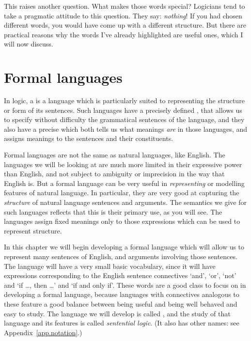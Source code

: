 This raises another question. What makes those words special? Logicians tend to take a pragmatic attitude to this question. They say: \emph{nothing}! If you had chosen different words, you would have come up with a different structure. But there are practical reasons why the words I've already highlighted are useful ones, which I will now discuss.

\section{Formal languages}

In logic, a  is a language which is particularly suited to representing the structure or form of its sentences. Such languages have a precisely defined , that allows us to specify without difficulty the grammatical sentences of the language, and they also have a precise  which both tells us what meanings \emph{are} in those languages, and assigns meanings to the sentences and their constituents. 

Formal languages are not the same as natural languages, like English. The languages we will be looking at are much more limited in their expressive power than English, and not subject to ambiguity or imprecision in the way that English is.  But a formal language can be very useful in \emph{representing} or modelling features of natural language. In particular, they are very good at capturing the \emph{structure} of natural language sentences and arguments. The semantics we give for such languages reflects that this is their primary use, as you will see. The languages assign fixed meanings only to those expressions which can be used to represent structure.

In this chapter we will begin developing a formal language which will allow us to represent many sentences of English, and arguments involving those sentences. The language will have a very small basic vocabulary, since it will have expressions corresponding to the English sentence connectives `and', `or', `not' and `if …, then …' and `if and only if'. These words are a good class to focus on in developing a formal language, because languages with connectives analogous to these feature a good balance between being useful and being well behaved and easy to study. The language we will develop is called \TFL, and the study of that language and its features is called \emph{sentential logic}. (It also has other names: see Appendix~\ref{app.notation}.)

